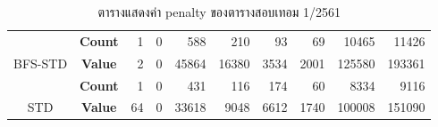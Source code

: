 \begin{table}[]
{\begin{tabular}{@{}ccrrrrrrrr@{}}
                                                 & \textbf{Count}                        & 1                         & 0                        & 588                          & 210                         & 93                          & 69                          & 10465                         & 11426                         \\ \cmidrule(l){2-10} 
    \multirow{-2}{*}{BFS-STD}                    & \textbf{Value}                        & 2                         & 0                        & 45864                        & 16380                       & 3534                        & 2001                        & 125580                        & 193361                        \\ \midrule
    {\color[HTML]{FE0000} }                      & {\color[HTML]{FE0000} \textbf{Count}} & {\color[HTML]{FE0000} 1}  & {\color[HTML]{FE0000} 0} & {\color[HTML]{FE0000} 431}   & {\color[HTML]{FE0000} 116}  & {\color[HTML]{FE0000} 174}  & {\color[HTML]{FE0000} 60}   & {\color[HTML]{FE0000} 8334}   & {\color[HTML]{FE0000} 9116}   \\ \cmidrule(l){2-10} 
    \multirow{-2}{*}{{\color[HTML]{FE0000} STD}} & {\color[HTML]{FE0000} \textbf{Value}} & {\color[HTML]{FE0000} 64} & {\color[HTML]{FE0000} 0} & {\color[HTML]{FE0000} 33618} & {\color[HTML]{FE0000} 9048} & {\color[HTML]{FE0000} 6612} & {\color[HTML]{FE0000} 1740} & {\color[HTML]{FE0000} 100008} & {\color[HTML]{FE0000} 151090} \\ \bottomrule
    \end{tabular}%
    }
    \caption{ตารางแสดงค่า penalty ของตารางสอบเทอม 1/2561}
    \label{tab:result_table_161}
\end{table}
